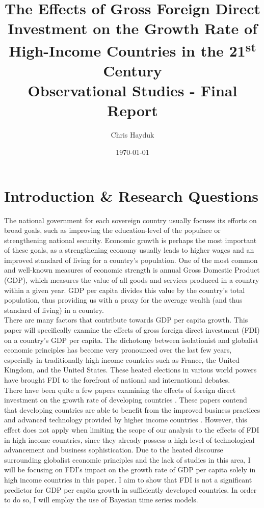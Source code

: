 \documentclass{article}
\title{The Effects of Gross Foreign Direct Investment on the Growth Rate of High-Income Countries in the 21\textsuperscript{st} Century\\
\large Observational Studies - Final Report}
\author{Chris Hayduk}
\date{\today}
\begin{document}

\doublespacing

\maketitle

\section{Introduction \& Research Questions}
\quad The national government for each sovereign country usually focuses its efforts on broad goals, such as improving the education-level of the populace or strengthening national security. Economic growth is perhaps the most important of these goals, as a strengthening economy usually leads to higher wages and an improved standard of living for a country's population. One of the most common and well-known measures of economic strength is annual Gross Domestic Product (GDP), which measures the value of all goods and services produced in a country within a given year. GDP per capita divides this value by the country's total population, thus providing us with a proxy for the average wealth (and thus standard of living) in a country.\\
\null\quad There are many factors that contribute towards GDP per capita growth. This paper will specifically examine the effects of gross foreign direct investment (FDI) on a country's GDP per capita. The dichotomy between isolationist and globalist economic principles has become very pronounced over the last few years, especially in traditionally high income countries such as France, the United Kingdom, and the United States. These heated elections in various world powers have brought FDI to the forefront of national and international debates.\\
\null\quad There have been quite a few papers examining the effects of foreign direct investment on the growth rate of developing countries \cite{borensztein, hansen}. These papers contend that developing countries are able to benefit from the improved business practices and advanced technology provided by higher income countries \cite{borensztein}. However, this effect does not apply when limiting the scope of our analysis to the effects of FDI in high income countries, since they already possess a high level of technological advancement and business sophistication. Due to the heated discourse surrounding globalist economic principles and the lack of studies in this area, I will be focusing on FDI's impact on the growth rate of GDP per capita solely in high income countries in this paper. I aim to show that FDI is not a significant predictor for GDP per capita growth in sufficiently developed countries. In order to do so, I will employ the use of Bayesian time series models.
\end{document}
